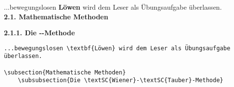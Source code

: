 \begin{frame}[fragile]
	\Losung
	\begin{outputbox}
		...bewegungslosen \textbf{Löwen} wird dem Leser als Übungsaufgabe überlassen. \\
		\vspace{12pt}
		{ \Large\textbf{2.1. Mathematische Methoden}}
		
		{ \large\textbf{2.1.1. Die --Methode}}
		
	\end{outputbox}

	\Code
	\begin{lstlisting}
...bewegungslosen \textbf{Löwen} wird dem Leser als Übungsaufgabe überlassen.

\subsection{Mathematische Methoden}
	\subsubsection{Die \textSC{Wiener}-\textSC{Tauber}-Methode}
		

	\end{lstlisting}
\end{frame}